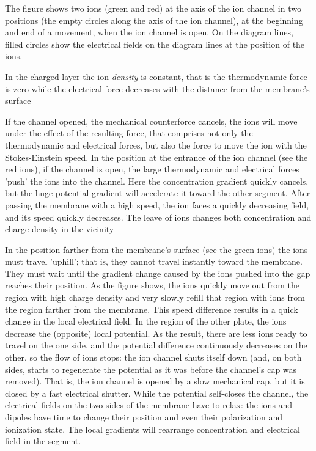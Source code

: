 The figure shows two ions (green and red) at the axis of the ion channel in two positions (the empty circles along the axis of the ion channel), at the beginning and end of a movement, when the ion channel is open.
On the diagram lines, filled circles show the electrical fields 
on the diagram lines at the position of the ions.

In the charged layer the ion \textit{density} is constant, that is the thermodynamic force is zero while the electrical force decreases with
the distance from the membrane's surface

If the channel opened, the mechanical counterforce cancels,
the ions will move under the effect of the resulting force,
that comprises not only the thermodynamic and electrical forces,
but also the force to move the ion with the Stokes-Einstein speed.
In the position at the entrance of the ion channel (see the red ions), if the channel is open, the large thermodynamic and electrical forces 'push' the ions into the channel. Here the concentration gradient quickly cancels, but the huge potential gradient will accelerate it toward the other segment. After passing the membrane with a high speed, the ion faces a quickly decreasing field, and its speed quickly decreases. The leave of ions changes both concentration and charge density in the vicinity

In the position farther from the membrane's surface (see the green ions) the ions must travel 'uphill'; that is, they cannot travel instantly toward the membrane.
They must wait until the gradient change caused by the ions pushed into the gap reaches their position.
As the figure shows, the ions quickly move out from the region with
high charge density and very slowly refill that region with ions from the region farther from the membrane.
This speed difference results in a quick change in the local electrical field.
In the region of the other plate, the ions decrease the (opposite)
local potential. As the result, there are less ions ready to travel
on the one side, and the potential difference continuously decreases
on the other, so the flow of ions stops: the ion channel shuts itself down (and, on both sides, starts to regenerate the potential as it was 
before the channel's cap was removed).
That is, the ion channel is opened by a slow mechanical cap,
but it is closed by a fast electrical shutter. While the potential
self-closes the channel, the electrical fields on  the two sides of the membrane have to relax: the ions and dipoles have time to change their
position and even their polarization and ionization state.
The local gradients will rearrange concentration and electrical field in the segment.


